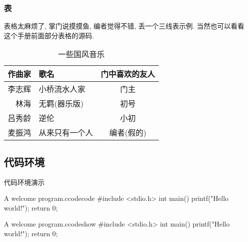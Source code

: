 \documentclass[hyperref,UTF8,11pt]{beamer}
\begin{document}
\cprotEnv\begin{frame}
	\frametitle{表}
	表格太麻烦了, 掌门说摸摸鱼, 编者觉得不错, 丢一个三线表示例. 当然也可以看看这个手册前面部分表格的源码.
	\begin{table}[htbp]
		\centering
		\caption{一些国风音乐}
		\label{tab:YixieGfyy}
		\begin{tabular}{rlc}
			\toprule
			作曲家 & 歌名 & 门中喜欢的友人 \\
			\midrule
			李志辉 & 小桥流水人家 & 门主 \\
			林海 & 无羁(器乐版) & 初号 \\
			吕秀龄 & 逆伦 & 小初 \\
			麦振鸿 & 从来只有一个人 & 编者(假的) \\
			\bottomrule
		\end{tabular}
	\end{table}
\end{frame}

\subsection{代码环境}
\begin{frame}[fragile]{代码环境演示}
	\begin{SCUcode}[]{A welcome program.}{c}{}{codecode}
		#include <stdio.h>
		int main() {
			printf("Hello world!\n");
			return 0;
		}
	\end{SCUcode}
	\begin{SCUshow}[]{A welcome program.}{c}{}{codeshow}
		#include <stdio.h>
		int main() {
			printf("Hello world!\n");
			return 0;
		}
	\end{SCUshow}
\end{frame}
\end{document}
